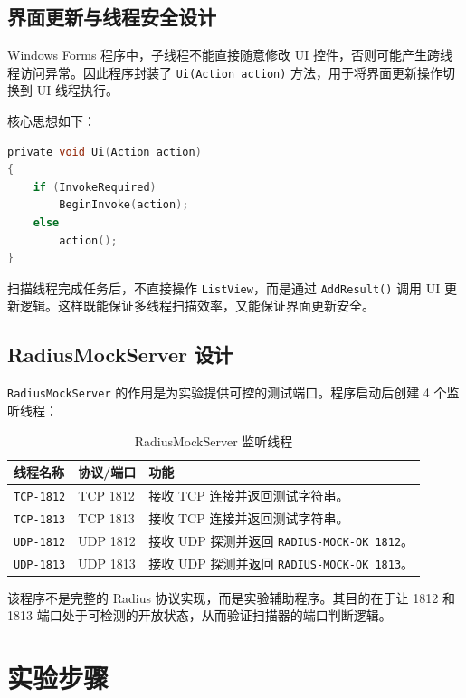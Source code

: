 \documentclass[UTF8,a4paper,12pt]{ctexart}
\begin{document}
\subsection{界面更新与线程安全设计}

Windows Forms 程序中，子线程不能直接随意修改 UI 控件，否则可能产生跨线程访问异常。因此程序封装了 \texttt{Ui(Action action)} 方法，用于将界面更新操作切换到 UI 线程执行。

核心思想如下：

\begin{lstlisting}[language=C]
private void Ui(Action action)
{
    if (InvokeRequired)
        BeginInvoke(action);
    else
        action();
}
\end{lstlisting}

扫描线程完成任务后，不直接操作 \texttt{ListView}，而是通过 \texttt{AddResult()} 调用 UI 更新逻辑。这样既能保证多线程扫描效率，又能保证界面更新安全。

\subsection{RadiusMockServer 设计}

\texttt{RadiusMockServer} 的作用是为实验提供可控的测试端口。程序启动后创建 4 个监听线程：

\begin{table}[H]
\centering
\caption{RadiusMockServer 监听线程}
\begin{tabularx}{0.82\textwidth}{C{3cm}C{3cm}Y}
\toprule
线程名称 & 协议/端口 & 功能 \\
\midrule
\texttt{TCP-1812} & TCP 1812 & 接收 TCP 连接并返回测试字符串。 \\
\texttt{TCP-1813} & TCP 1813 & 接收 TCP 连接并返回测试字符串。 \\
\texttt{UDP-1812} & UDP 1812 & 接收 UDP 探测并返回 \texttt{RADIUS-MOCK-OK 1812}。 \\
\texttt{UDP-1813} & UDP 1813 & 接收 UDP 探测并返回 \texttt{RADIUS-MOCK-OK 1813}。 \\
\bottomrule
\end{tabularx}
\end{table}

该程序不是完整的 Radius 协议实现，而是实验辅助程序。其目的在于让 1812 和 1813 端口处于可检测的开放状态，从而验证扫描器的端口判断逻辑。

\section{实验步骤}
\end{document}
